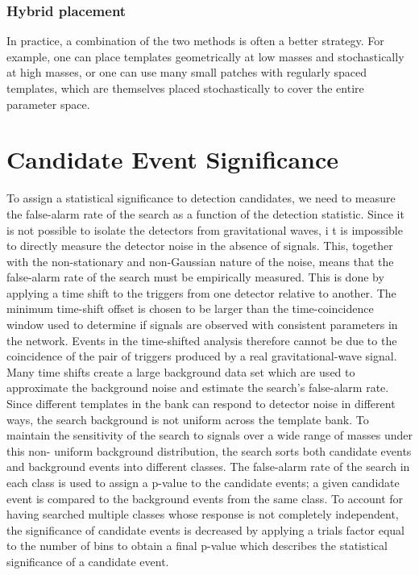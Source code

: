 \documentclass[binding=0.6cm, LaM]{sapthesis}
\begin{document}
\subsubsection{Hybrid placement}

	In practice, a combination of the two methods is often a better strategy. 
	For example, one can place templates geometrically at low masses 
	and stochastically at high masses, or one can use many small patches 
	with regularly spaced templates, which are themselves placed stochastically 
	to cover the entire parameter space. 

\section{Candidate Event Significance}


	To assign a statistical significance to detection candidates, 
	we need to measure the false-alarm rate of the search as a function of the detection statistic.
	Since it is not possible to isolate the detectors from gravitational waves, i
	t is impossible to directly measure the detector noise in the absence of signals. 
	This, together with the non-stationary and non-Gaussian nature of the noise, 
	means that the false-alarm rate of the search must be empirically measured. 
	This is done by applying a time shift to the triggers from one detector relative to another. 
	The minimum time-shift offset is chosen to be larger than the time-coincidence window 
	used to determine if signals are observed with consistent parameters in the network. 
	Events in the time-shifted analysis therefore cannot be due to the coincidence 
	of the pair of triggers produced by a real gravitational-wave signal. 
	Many time shifts create a large background data set which are used to 
	approximate the background noise and estimate the search’s false-alarm rate. 
	Since different templates in the bank can respond to detector noise in different ways, 
	the search background is not uniform across the template bank. 
	To maintain the sensitivity of the search to signals over a wide range 
	of masses under this non- uniform background distribution, 
	the search sorts both candidate events and background events into different classes. 
	The false-alarm rate of the search in each class is used to 
	assign a p-value to the candidate events; 
	a given candidate event is compared to the background events from the same class. 
	To account for having searched multiple classes 
	whose response is not completely independent, 
	the significance of candidate events is decreased by applying 
	a trials factor equal to the number of bins to obtain a final p-value 
	which describes the statistical significance of a candidate event. 
\end{document}
